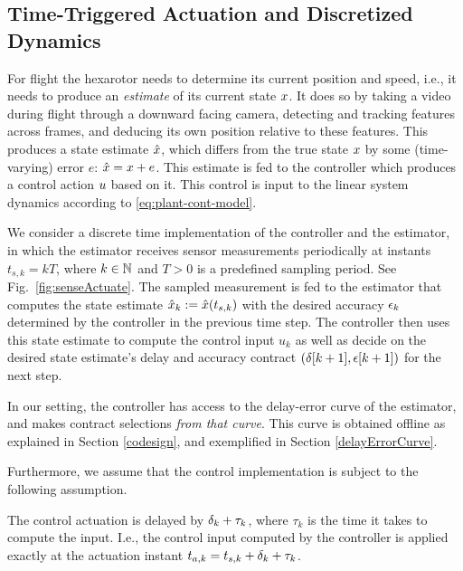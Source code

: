 \subsection{Time-Triggered Actuation and Discretized Dynamics}

For flight the hexarotor needs to determine its current position and speed, i.e., it needs to produce an \emph{estimate} of its current state $x$.
It does so by taking a video during flight through a downward facing camera, detecting and tracking features across frames, and deducing its own position relative to these features.
This produces a state estimate $\hat{x}$, which differs from the true state $x$ by some (time-varying) error $e$: $\hat{x} = x + e$.
This estimate is fed to the controller which produces a control action $u$ based on it.
This control is input to the linear system dynamics according to \eqref{eq:plant-cont-model}.

We consider a discrete time implementation of the controller and the estimator, in which the estimator receives sensor measurements periodically at instants $t_{s,k}=kT$,
where $k\in\mathbb{N}$ and $T>0$ is a predefined sampling period.
See Fig.~\ref{fig:senseActuate}.
The sampled measurement is fed to the estimator that computes the state
estimate $\hat{x}_{k}:=\hat{x}(t_{s,k})$ with the desired
accuracy $\epsilon_k$ determined by the controller
in the previous time step. 
The controller then uses this state estimate
to compute the control input $u_{k}$ as well as decide on the desired
state estimate's delay and accuracy contract $(\delta[k+1],\epsilon[k+1])$ for the next step. 

In our setting, the controller has access to the delay-error curve of the estimator, and makes contract selections \emph{from that curve}. 
This curve is obtained offline as explained in Section \ref{codesign}, and exemplified in Section \ref{delayErrorCurve}.

Furthermore, we assume that the control implementation
is subject to the following assumption.
\begin{ass}
	The control actuation is delayed by $\delta_k+\tau_k$, where $\tau_k$ is the time it takes to compute the input.
	I.e., the control input computed by the controller is applied exactly
	at the actuation instant $t_{a,k}=t_{s,k}+\delta_k+\tau_k$.
\end{ass}

